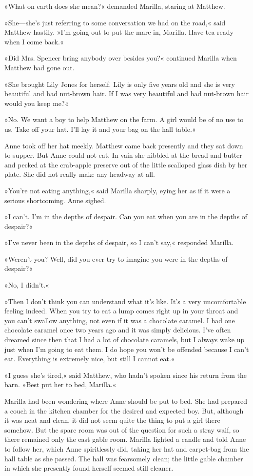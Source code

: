 »What on earth does she mean?« demanded Marilla, staring at Matthew.

»She—she’s just referring to some conversation we had on the road,« said Matthew hastily. »I’m going out to put the mare in, Marilla. Have tea ready when I come back.«

»Did Mrs. Spencer bring anybody over besides you?« continued Marilla when Matthew had gone out.

»She brought Lily Jones for herself. Lily is only five years old and she is very beautiful and had nut-brown hair. If I was very beautiful and had nut-brown hair would you keep me?«

»No. We want a boy to help Matthew on the farm. A girl would be of no use to us. Take off your hat. I’ll lay it and your bag on the hall table.«

Anne took off her hat meekly. Matthew came back presently and they sat down to supper. But Anne could not eat. In vain she nibbled at the bread and butter and pecked at the crab-apple preserve out of the little scalloped glass dish by her plate. She did not really make any headway at all.

»You’re not eating anything,« said Marilla sharply, eying her as if it were a serious shortcoming. Anne sighed.

»I can’t. I’m in the depths of despair. Can you eat when you are in the depths of despair?«

»I’ve never been in the depths of despair, so I can’t say,« responded Marilla.

»Weren’t you? Well, did you ever try to imagine you were in the depths of despair?«

»No, I didn’t.«

»Then I don’t think you can understand what it’s like. It’s a very uncomfortable feeling indeed. When you try to eat a lump comes right up in your throat and you can’t swallow anything, not even if it was a chocolate caramel. I had one chocolate caramel once two years ago and it was simply delicious. I’ve often dreamed since then that I had a lot of chocolate caramels, but I always wake up just when I’m going to eat them. I do hope you won’t be offended because I can’t eat. Everything is extremely nice, but still I cannot eat.«

»I guess she’s tired,« said Matthew, who hadn’t spoken since his return from the barn. »Best put her to bed, Marilla.«

Marilla had been wondering where Anne should be put to bed. She had prepared a couch in the kitchen chamber for the desired and expected boy. But, although it was neat and clean, it did not seem quite the thing to put a girl there somehow. But the spare room was out of the question for such a stray waif, so there remained only the east gable room. Marilla lighted a candle and told Anne to follow her, which Anne spiritlessly did, taking her hat and carpet-bag from the hall table as she passed. The hall was fearsomely clean; the little gable chamber in which she presently found herself seemed still cleaner.

